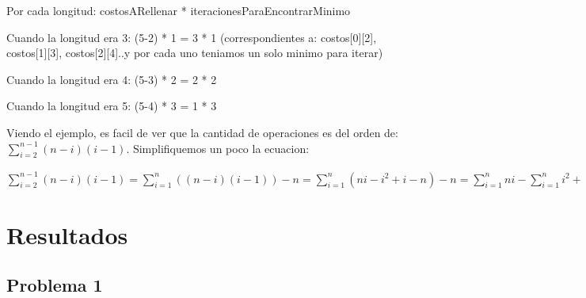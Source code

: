 \documentclass[12pt, a4paper,english,spanish]{article}
\begin{document}
Por cada longitud: costosARellenar * iteracionesParaEncontrarMinimo

\vspace{0.5cm}

Cuando la longitud era 3: (5-2) * 1 = 3 * 1 (correspondientes a: costos[0][2], costos[1][3], costos[2][4]..y por cada uno teniamos un solo minimo para iterar)

\vspace{0.02cm}

Cuando la longitud era 4: (5-3) * 2 = 2 * 2

\vspace{0.02cm}

Cuando la longitud era 5: (5-4) * 3 = 1 * 3

\vspace{0.5cm}

Viendo el ejemplo, es facil de ver que la cantidad de operaciones es del orden de: $\displaystyle\sum_{i=2}^{n-1} (n-i)(i-1)$. Simplifiquemos un poco la ecuacion:

\vspace{0.5cm}

$\displaystyle\sum_{i=2}^{n-1} (n-i)(i-1) = \displaystyle\sum_{i=1}^{n}( (n-i)(i-1) ) - n = \displaystyle\sum_{i=1}^{n}(ni-i^{2} + i - n) - n = \displaystyle\sum_{i=1}^{n} ni - \displaystyle\sum_{i=1}^{n} i^{2} + \displaystyle\sum_{i=1}^{n} i - \displaystyle\sum_{i=1}^{n} n -  n=  n \frac{n(n+1)}{2}  - \frac{n(n+1)(2n+1)}{6}  + \frac{n(n+1)}{2}  - n^{2} - n = \frac{n(n+1)(n+1)}{6}+ \frac{n(n+1)}{2}  - n^{2} - n = \frac{n(n+1)(n+1)}{6} + \frac{3(n-n^{2})}{6} - n = \frac{n^{3} - n^{2} + 4n}{6} - n = \frac{n^{3} - n^{2} - 2n}{6} = \mathcal{O}(n^{3})$
 




\newpage



\section{Resultados}

\subsection*{Problema 1}
\end{document}
